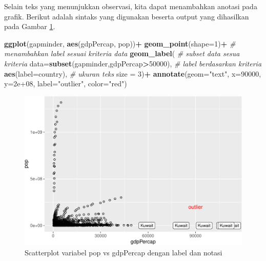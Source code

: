 \documentclass[]{book}
\newenvironment{Shaded}{\begin{snugshade}}{\end{snugshade}}
\newcommand{\KeywordTok}[1]{\textcolor[rgb]{0.13,0.29,0.53}{\textbf{#1}}}
\newcommand{\DataTypeTok}[1]{\textcolor[rgb]{0.13,0.29,0.53}{#1}}
\newcommand{\DecValTok}[1]{\textcolor[rgb]{0.00,0.00,0.81}{#1}}
\newcommand{\FloatTok}[1]{\textcolor[rgb]{0.00,0.00,0.81}{#1}}
\newcommand{\StringTok}[1]{\textcolor[rgb]{0.31,0.60,0.02}{#1}}
\newcommand{\CommentTok}[1]{\textcolor[rgb]{0.56,0.35,0.01}{\textit{#1}}}
\newcommand{\OperatorTok}[1]{\textcolor[rgb]{0.81,0.36,0.00}{\textbf{#1}}}
\newcommand{\NormalTok}[1]{#1}
\begin{document}
Selain teks yang menunjukkan observasi, kita dapat menambahkan anotasi
pada grafik. Berikut adalah sintaks yang digunakan beserta output yang
dihasilkan pada Gambar \ref{fig:gglabel3}.

\begin{Shaded}
\begin{Highlighting}[]
\KeywordTok{ggplot}\NormalTok{(gapminder, }\KeywordTok{aes}\NormalTok{(gdpPercap, pop))}\OperatorTok{+}
\StringTok{  }\KeywordTok{geom_point}\NormalTok{(}\DataTypeTok{shape=}\DecValTok{1}\NormalTok{)}\OperatorTok{+}
\StringTok{  }\CommentTok{# menambahkan label sesuai kriteria data}
\StringTok{  }\KeywordTok{geom_label}\NormalTok{(}
    \CommentTok{# subset data sesua kriteria}
    \DataTypeTok{data=}\KeywordTok{subset}\NormalTok{(gapminder,gdpPercap}\OperatorTok{>}\DecValTok{50000}\NormalTok{),}
    \CommentTok{# label berdasarkan kriteria}
    \KeywordTok{aes}\NormalTok{(}\DataTypeTok{label=}\NormalTok{country),}
    \CommentTok{# ukuran teks}
    \DataTypeTok{size =} \DecValTok{3}\NormalTok{)}\OperatorTok{+}
\StringTok{  }\KeywordTok{annotate}\NormalTok{(}\DataTypeTok{geom=}\StringTok{"text"}\NormalTok{, }\DataTypeTok{x=}\DecValTok{90000}\NormalTok{,}
          \DataTypeTok{y=}\FloatTok{2e+08}\NormalTok{, }\DataTypeTok{label=}\StringTok{"outlier"}\NormalTok{,}
          \DataTypeTok{color=}\StringTok{"red"}\NormalTok{)}
\end{Highlighting}
\end{Shaded}

\begin{figure}

{\centering \includegraphics[width=0.7\linewidth]{EnvStat_files/figure-latex/gglabel3-1} 

}

\caption{Scatterplot variabel pop vs gdpPercap dengan label dan notasi}\label{fig:gglabel3}
\end{figure}
\end{document}
